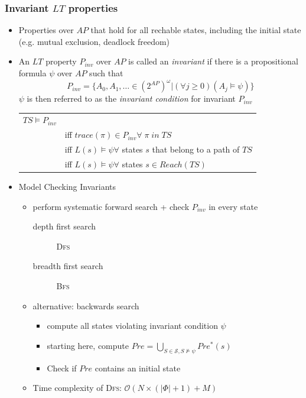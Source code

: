 \documentclass[a4paper, 10pt]{article}
\begin{document}
\subsubsection*{Invariant $LT$ properties}
\begin{itemize}
    \item Properties over $AP$ that hold for all rechable states, including the initial state (e.g. mutual exclusion, deadlock freedom)
    \item
    \begin{shaded}
        An $LT$ property $P_{inv}$ over $AP$ is called an \emph{invariant} if there is a propositional formula $\psi$ over $AP$ such that
        \[ P_{inv} = \{ A_0,A_1,\dots\in (2^{AP})^\omega | (\forall j\geq0)(A_j\models\psi) \} \]
        $\psi$ is then referred to as the \emph{invariant condition} for invariant $P_{inv}$
    \end{shaded}
    \begin{tabular}[t]{ll}
    $TS\models P_{inv}$ & \\
    & iff $trace(\pi)\in P_{inv}\forall \; \pi \; in \; TS$ \\
    & iff $L(s)\models\psi\forall$ states $s$ that belong to a path of $TS$ \\
    & iff $L(s)\models\psi\forall$ states $s\in Reach(TS)$
    \end{tabular}
    \item Model Checking Invariants
    \begin{itemize}
        \item perform systematic forward search + check $P_{inv}$ in every state
        \begin{description}
            \item[depth first search] \textsc{Dfs}
            \item[breadth first search] \textsc{Bfs}
        \end{description}
        \item alternative: backwards search
        \begin{itemize}
            \item compute all states violating invariant condition $\psi$
            \item starting here, compute $Pre=\bigcup_{S\in\mathcal{S},S\not\models\psi}Pre^*(s)$
            \item Check if $Pre$ contains an initial state
        \end{itemize}
        \item Time complexity of \textsc{Dfs}: $\mathcal{O}(N\times(|\Phi|+1)+M)$

\end{itemize}
\end{itemize}
\end{document}
